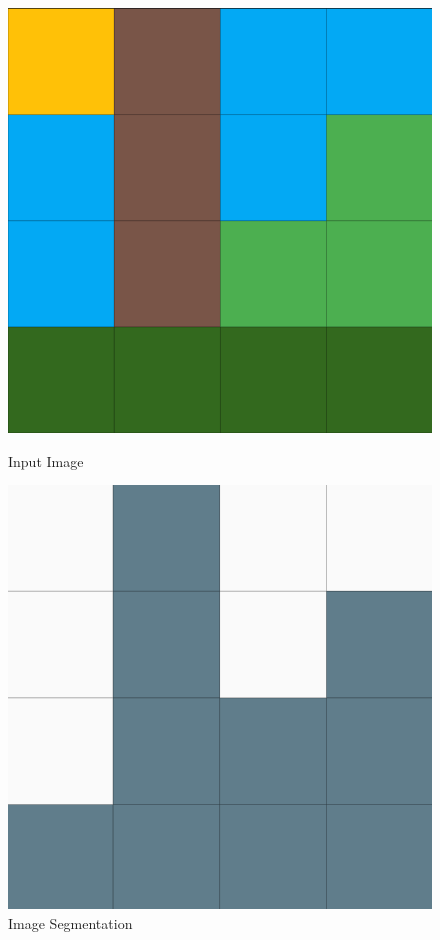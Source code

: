 \documentclass[11pt,addpoints,answers]{exam}
\numberwithin{equation}{section} %
\numberwithin{figure}{section} %
\numberwithin{table}{section} %
\begin{document}
\begin{figure}[!htb]
\centering
{}
  \includegraphics[width=\linewidth]{figures/image.png}
  \caption{Input Image}\label{fig:pixel_grid}
\endminipage\hspace{1em}
  \includegraphics[width=\linewidth]{figures/class.png}
  \caption{Image Segmentation}\label{fig:seg_grid}
\endminipage
\end{figure}
\end{document}
